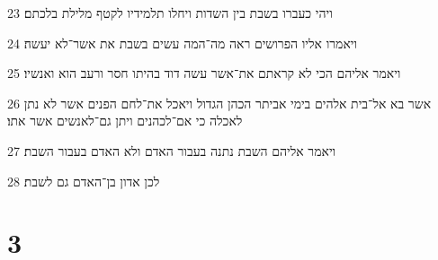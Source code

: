\par 23 ויהי כעברו בשבת בין השדות ויחלו תלמידיו לקטף מלילת בלכתם׃
\par 24 ויאמרו אליו הפרושים ראה מה־המה עשים בשבת את אשר־לא יעשה׃
\par 25 ויאמר אליהם הכי לא קראתם את־אשר עשה דוד בהיתו חסר ורעב הוא ואנשיו׃
\par 26 אשר בא אל־בית אלהים בימי אביתר הכהן הגדול ויאכל את־לחם הפנים אשר לא נתן לאכלה כי אם־לכהנים ויתן גם־לאנשים אשר אתו׃
\par 27 ויאמר אליהם השבת נתנה בעבור האדם ולא האדם בעבור השבת׃
\par 28 לכן אדון בן־האדם גם לשבת׃

\chapter{3}

